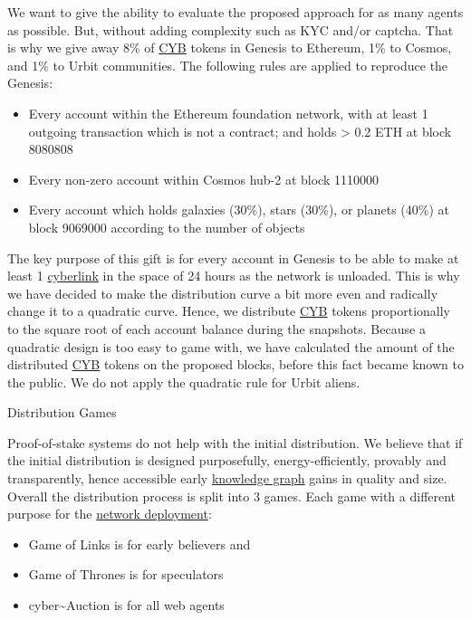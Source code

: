 \documentclass[8pt,oneside]{amsart}
\makeatletter
\newcommand{\linkred}[2]{\href{#1}{\color{red}{#2}}}
\renewcommand\subsection{\@startsection{subsection}
                                    {2}{\z@}
                                    {-3.25ex\@plus -1ex \@minus -.2ex}
                                    {0ex \@plus .2ex}
                                    {\play\Large}
                        }
\newcommand{\titleSection}[1]{\subsection{#1}}
\makeatother
\begin{document}
We want to give the ability to evaluate the proposed approach for as many agents as possible. But, without adding complexity such as KYC and/or captcha. That is why we give away 8\% of {\hyperref[cyb]{CYB}} tokens in Genesis to Ethereum, 1\% to Cosmos, and 1\% to Urbit communities. The following rules are applied to reproduce the Genesis:
\begin{itemize}
 \item Every account within the Ethereum foundation network, with at least 1 outgoing transaction which is not a contract; and holds > 0.2 ETH at block 8080808
 \item Every non-zero account within Cosmos hub-2 at block 1110000
 \item Every account which holds galaxies (30\%), stars (30\%), or planets (40\%) at block 9069000 according to the number of objects
\end{itemize}

The key purpose of this gift is for every account in Genesis to be able to make at least 1 {\hyperref[cyberlinks]{cyberlink}} in the space of 24 hours as the network is unloaded. This is why we have decided to make the distribution curve a bit more even and radically change it to a quadratic curve. Hence, we distribute {\hyperref[cyb]{CYB}} tokens proportionally to the square root of each account balance during the snapshots. Because a quadratic design is too easy to game with, we have calculated the amount of the distributed {\hyperref[cyb]{CYB}} tokens on the proposed blocks, before this fact became known to the public. We do not apply the quadratic rule for Urbit aliens.

\titleSection{Distribution Games}\label{distribution-games}

Proof-of-stake systems do not help with the initial distribution. We believe that if the initial distribution is designed purposefully, energy-efficiently, provably and transparently, hence accessible early {\hyperref[knowledge-graph]{knowledge graph}} gains in quality and size. Overall the distribution process is split into 3 games. Each game with a different purpose for the {\hyperref[deployment]{network deployment}}:

\begin{itemize}
\item Game of Links is for early believers and \linkred{https://cybercongress.ai/docs/cyberd/run_validator/}{Genesis validators}
\item Game of Thrones is for speculators
\item cyber\~{}Auction is for all web agents
\end{itemize}
\end{document}
